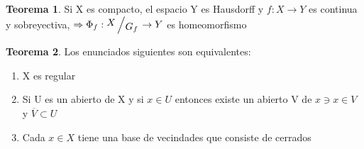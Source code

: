 \documentclass{article}
\theoremstyle{definition}
\newtheorem{theorem}{Teorema}[section]
\newcommand{\bigslant}[2]{{\raisebox{.2em}{$#1$}\left/\raisebox{-.2em}{$#2$}\right.}}
\begin{document}

\begin{theorem}
	Si X es compacto, el espacio Y es Hausdorff y $f:X\to Y$ es continua y sobreyectiva, $\Rightarrow \Phi_f:\bigslant{X}{G_f}\to Y$ es homeomorfismo
\end{theorem}


\begin{theorem}
	Los enunciados siguientes son equivalentes:
	\begin{enumerate}
		\item X es regular
		\item Si U es un abierto de X y si $x\in U$ entonces existe un abierto V de $x\ni x\in V$ y $\overline{V}\subset U$
		\item Cada $x\in X$ tiene una base de vecindades que consiste de cerrados
	\end{enumerate}
\end{theorem}
\end{document}
